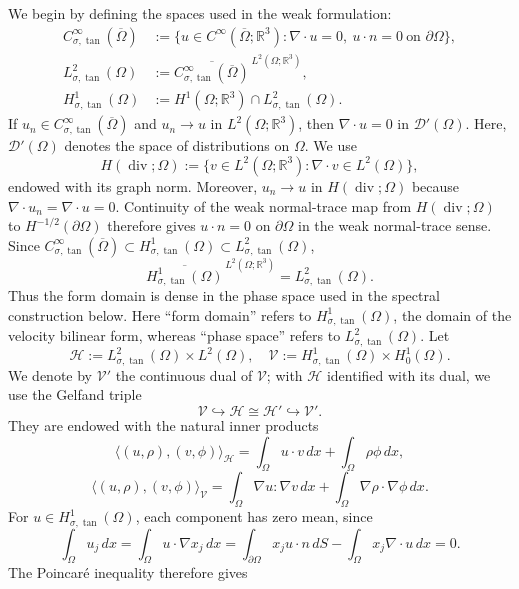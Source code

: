 \documentclass[11pt,reqno]{amsart}
\theoremstyle{plain}
\numberwithin{equation}{section}
\newcommand{\Ltwosigma}{L^2_{\sigma,\tan}(\Omega)}
\newcommand{\Honesigma}{H^{1}_{\sigma,\tan}(\Omega)}
\begin{document}
We begin by defining the spaces used in the weak formulation:
\[
\begin{aligned}
C^\infty_{\sigma,\tan}(\overline\Omega)
&:=\{u\in C^\infty(\overline\Omega;\mathbb R^3):
\nabla\cdot u=0,\ u\cdot n=0\ \text{on }\partial\Omega\},\\
{L^2_{\sigma,\tan}(\Omega)}
&{:=\overline{C^\infty_{\sigma,\tan}(\overline\Omega)}^{\,L^2(\Omega;\mathbb R^3)},}\\
H^1_{\sigma,\tan}(\Omega)&:=H^1(\Omega;\mathbb R^3)\cap L^2_{\sigma,\tan}(\Omega).
\end{aligned}
\]
{If \(u_n\in C^\infty_{\sigma,\tan}(\overline\Omega)\)
and \(u_n\to u\) in \(L^2(\Omega;\mathbb R^3)\), then
\(\nabla\cdot u=0\) in \(\mathcal D'(\Omega)\). 
Here, \(\mathcal D'(\Omega)\) denotes the space of distributions on \(\Omega\).
We use
\[
H(\operatorname{div};\Omega)
:=\{v\in L^2(\Omega;\mathbb R^3):\nabla\cdot v\in L^2(\Omega)\},
\]
endowed with its graph norm.
Moreover,
\(u_n\to u\) in \(H(\operatorname{div};\Omega)\) because
\(\nabla\cdot u_n=\nabla\cdot u=0\). Continuity of the weak normal-trace
map from \(H(\operatorname{div};\Omega)\) to
\(H^{-1/2}(\partial\Omega)\) therefore gives \(u\cdot n=0\) on
\(\partial\Omega\) in the weak normal-trace sense.}
{Since
\(C^\infty_{\sigma,\tan}(\overline\Omega)
\subset H^1_{\sigma,\tan}(\Omega)
\subset L^2_{\sigma,\tan}(\Omega)\),}
\[
{
\overline{H^1_{\sigma,\tan}(\Omega)}^{\,L^2(\Omega;\mathbb R^3)}
=
L^2_{\sigma,\tan}(\Omega).}
\]
Thus the form domain is dense in the phase space used in
the spectral construction below. Here ``form domain'' refers to
\(H^1_{\sigma,\tan}(\Omega)\), the domain of the velocity bilinear form,
whereas ``phase space'' refers to \(L^2_{\sigma,\tan}(\Omega)\).
Let
\[
\mathcal{H}:=\Ltwosigma\times L^2(\Omega), \quad \mathcal{V}:=\Honesigma\times H^1_0(\Omega).
\]
We denote by $\mathcal V'$ the continuous dual of $\mathcal V$; with
$\mathcal H$ identified with its dual, we use the Gelfand triple
\[
\mathcal V\hookrightarrow\mathcal H\cong\mathcal H'\hookrightarrow\mathcal V'.
\]
They are endowed with the natural inner products
\[
\langle (u,\rho),(v,\phi) \rangle_{\mathcal{H}}=\int_\Omega u\cdot {v}\,dx+\int_\Omega\rho\phi\,dx,
\]
\[
\langle({u},\rho),({v},\phi)\rangle_{\mathcal{V}}=\int_\Omega\nabla u : \nabla {v}\,dx+\int_\Omega\nabla\rho\cdot\nabla \phi\,dx.
\]
For $u\in H^1_{\sigma,\tan}(\Omega)$, each component has zero mean, since
\[
\int_\Omega u_j\,dx
=\int_\Omega u\cdot\nabla x_j\,dx
=\int_{\partial\Omega}x_j u\cdot n\,dS
-\int_\Omega x_j\nabla\cdot u\,dx
=0.
\]
The Poincar\'e inequality therefore gives
\end{document}
